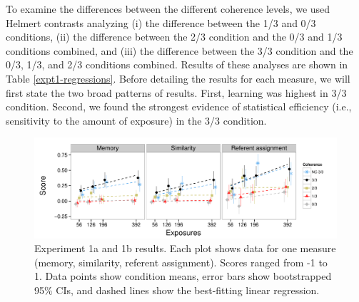 \documentclass[man,floatsintext]{apa6}
\begin{document}
To examine the differences between the different coherence levels, we used Helmert contrasts analyzing (i) the difference between the 1/3 and 0/3 conditions, (ii) the difference between the 2/3 condition and the 0/3 and 1/3 conditions combined, and (iii) the difference between the 3/3 condition and the 0/3, 1/3, and 2/3 conditions combined. Results of these analyses are shown in Table \ref{expt1-regressions}. Before detailing the results for each measure, we will first state the two broad patterns of results. First, learning was highest in 3/3 condition. Second, we found the strongest evidence of statistical efficiency (i.e., sensitivity to the amount of exposure) in the 3/3 condition.

\begin{figure}[t]
  \begin{center}
    \includegraphics[width=1.0\linewidth]{x1}
    \caption{Experiment 1a and 1b results. Each plot shows data for one measure (memory, similarity, referent assignment). Scores ranged from -1 to 1. Data points show condition means, error bars show bootstrapped 95\% CIs, and dashed lines show the best-fitting linear regression.}
    \label{expt1-results}
  \end{center}
\end{figure}

\newcommand{\ww}{\color{white}{$\enspace$}} \newcommand\T{\rule{0pt}{2.1ex}}
\end{document}
